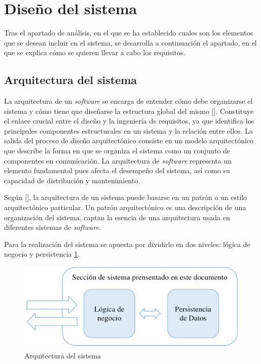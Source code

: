 \section{Diseño del sistema}
Tras el apartado de análisis, en el que se ha establecido cuales son los elementos que se desean incluir en el sistema, se desarrolla a continuación el apartado, en el que se explica cómo se quieren llevar a cabo los requisitos.

\subsection{Arquitectura del sistema}
La arquitectura de un \textit{software} se encarga de entender cómo debe organizarse el sistema y cómo tiene que diseñarse la estructura global del mismo [\cite{91}]. Constituye el enlace crucial entre el diseño y la ingeniería de requisitos, ya que identifica los principales componentes estructurales en un sistema y la relación entre ellos. La salida del proceso de diseño arquitectónico consiste en un modelo arquitectónico que describe la  forma en que se organiza el sistema como un conjunto de componentes en comunicación. La arquitectura de \textit{software} representa un elemento fundamental pues afecta el desempeño del sistema, así como su capacidad de distribución y mantenimiento.

Según [\cite{99}], la arquitectura de un sistema puede basarse en un patrón o un estilo arquitectónico particular. Un patrón arquitectónico es una descripción de una organización del sistema, captan la esencia de una arquitectura usada en diferentes sistemas de \textit{software}.

Para la realización del sistema se apuesta por dividirlo en dos niveles: lógica de negocio y persistencia \ref{fig:8}. 

\begin{figure}[h]
	\centering
	\includegraphics[width=\linewidth]{Graphics/arquitectura-bs.png}
	\caption{Arquitectura del sistema}
	\label{fig:8}
\end{figure}

